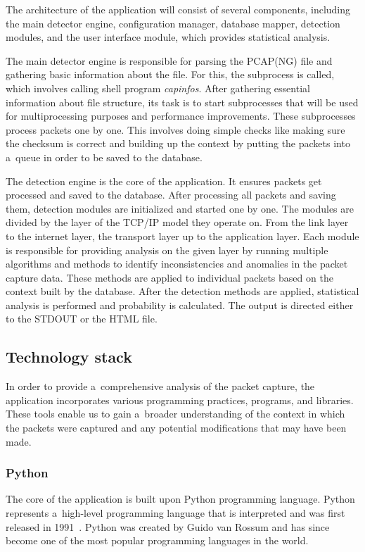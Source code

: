 \documentclass[
  printed,     %
  color,       %
  oneside,     %
  nosansbold,  %
  nocolorbold, %
  nolof,         %
  nolot,         %
]{fithesis4}
\begin{document}
The architecture of the application will consist of several components, including the main detector engine, configuration manager, database mapper, detection modules, and the user interface module, which provides statistical analysis.

The main detector engine is responsible for parsing the PCAP(NG) file and gathering basic information about the file. For this, the subprocess is called, which involves calling shell program \textit{capinfos}. After gathering essential information about file structure, its task is to start subprocesses that will be used for multiprocessing purposes and performance improvements. These subprocesses process packets one by one. This involves doing simple checks like making sure the checksum is correct and building up the context by putting the packets into a~queue in order to be saved to the database.

The detection engine is the core of the application. It ensures packets get processed and saved to the database. After processing all packets and saving them, detection modules are initialized and started one by one. The modules are divided by the layer of the TCP/IP model they operate on. From the link layer to the internet layer, the transport layer up to the application layer. Each module is responsible for providing analysis on the given layer by running multiple algorithms and methods to identify inconsistencies and anomalies in the packet capture data. These methods are applied to individual packets based on the context built by the database. After the detection methods are applied, statistical analysis is performed and probability is calculated. The output is directed either to the STDOUT or the HTML file.

\subsection{Technology stack}

In order to provide a~comprehensive analysis of the packet capture, the application incorporates various programming practices, programs, and libraries. These tools enable us to gain a~broader understanding of the context in which the packets were captured and any potential modifications that may have been made.


\subsubsection{Python}

The core of the application is built upon Python programming language. Python represents a~high-level programming language that is interpreted and was first released in 1991~\cite{lutz_2009}. Python was created by Guido van Rossum and has since become one of the most popular programming languages in the world.
\end{document}
